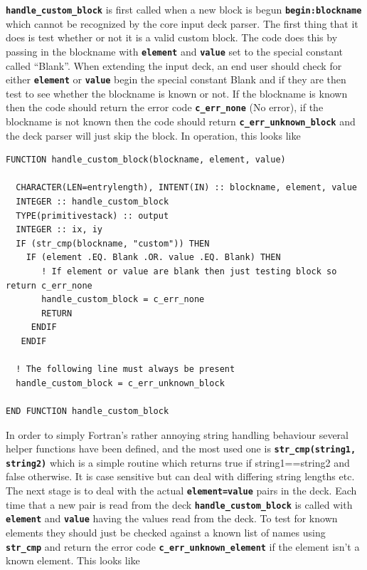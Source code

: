 \documentclass[12pt,a4paper]{article}
\newcommand{\simpleboxverbatim}{\begin{Verbatim}[obeytabs=true,frame=single,
  framerule=0.5mm,rulecolor=\color{warwickmid},formatcom=\color{black}]}
\newcommand{\inlinecode}[1]{{\color{warwickred} \bf\texttt{#1}}}
\begin{document}
\inlinecode{handle\_custom\_block} is first called when a new block is begun
\inlinecode{begin:blockname} which cannot be recognized by the core input deck
parser. The first thing that it does is test whether or not it is a valid
custom block. The code does this by passing in the blockname with
\inlinecode{element} and \inlinecode{value} set to the special constant called
``Blank''. When extending the input deck, an end user should check for either
\inlinecode{element} or \inlinecode{value} begin the special constant Blank
and if they are then test to see whether the blockname is known or not. If the
blockname is known then the code should return the error code
\inlinecode{c\_err\_none} (No error), if the blockname is not known then the code
should return \inlinecode{c\_err\_unknown\_block} and the deck parser will just
skip the block. In operation, this looks like

\simpleboxverbatim
FUNCTION handle_custom_block(blockname, element, value)

  CHARACTER(LEN=entrylength), INTENT(IN) :: blockname, element, value
  INTEGER :: handle_custom_block
  TYPE(primitivestack) :: output
  INTEGER :: ix, iy
  IF (str_cmp(blockname, "custom")) THEN
    IF (element .EQ. Blank .OR. value .EQ. Blank) THEN
       ! If element or value are blank then just testing block so return c_err_none
       handle_custom_block = c_err_none
       RETURN
     ENDIF
   ENDIF

  ! The following line must always be present
  handle_custom_block = c_err_unknown_block

END FUNCTION handle_custom_block
\end{Verbatim}

In order to simply Fortran's rather annoying string handling behaviour several
helper functions have been defined, and the most used one is
\inlinecode{str\_cmp(string1, string2)} which is a simple routine which returns
true if string1==string2 and false otherwise. It is case sensitive but can
deal with differing string lengths etc. The next stage is to deal with the
actual \inlinecode{element=value} pairs in the deck. Each time that a new pair
is read from the deck \inlinecode{handle\_custom\_block} is called with
\inlinecode{element} and \inlinecode{value} having the values read from the
deck. To test for known elements they should just be checked against a known
list of names using \inlinecode{str\_cmp} and return the error code
\inlinecode{c\_err\_unknown\_element} if the element isn't a known element. This
looks like
\end{document}
